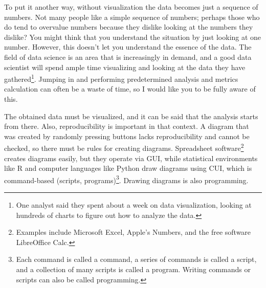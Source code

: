 \documentclass{ltjsbook}
\begin{document}
To put it another way, without visualization the data becomes just a sequence of numbers. Not many people like a simple sequence of numbers; perhaps those who do tend to overvalue numbers because they dislike looking at the numbers they dislike? You might think that you understand the situation by just looking at one number. However, this doesn't let you understand the essence of the data. The field of data science is an area that is increasingly in demand, and a good data scientist will spend ample time visualizing and looking at the data they have gathered\footnote{One analyst said they spent about a week on data visualization, looking at hundreds of charts to figure out how to analyze the data.}. Jumping in and performing predetermined analysis and metrics calculation can often be a waste of time, so I would like you to be fully aware of this.

The obtained data must be visualized, and it can be said that the analysis starts from there. Also, reproducibility is important in that context. A diagram that was created by randomly pressing buttons lacks reproducibility and cannot be checked, so there must be rules for creating diagrams. Spreadsheet software\footnote{Examples include Microsoft Excel, Apple's Numbers, and the free software LibreOffice Calc.} creates diagrams easily, but they operate via GUI, while statistical environments like R and computer languages like Python draw diagrams using CUI, which is command-based (scripts, programs)\footnote{Each command is called a command, a series of commands is called a script, and a collection of many scripts is called a program. Writing commands or scripts can also be called programming.}. Drawing diagrams is also programming.
\end{document}
